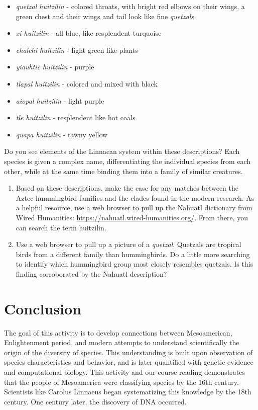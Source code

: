 \documentclass[12pt]{article}
\begin{document}
\begin{itemize}
\item \textit{quetzal huitzilin} - colored throats, with bright red elbows on their wings, a green chest and their wings and tail look like fine \textit{quetzals}
\item \textit{xi huitzilin} - all blue, like resplendent turquoise
\item \textit{chalchi huitzilin} - light green like plants
\item \textit{yiauhtic huitzilin} - purple
\item \textit{tlapal huitzilin} - colored and mixed with black
\item \textit{aiopal huitzilin} - light purple
\item \textit{tle huitzilin} - resplendent like hot coals
\item \textit{quapa huitzilin} - tawny yellow
\end{itemize}

Do you see elements of the Linnaean system within these descriptions?  Each species is given a complex name, differentiating the individual species from each other, while at the same time binding them into a family of similar creatures.

\begin{enumerate}
\item Based on these descriptions, make the case for any matches between the Aztec hummingbird families and the clades found in the modern research. As a helpful resource, use a web browser to pull up the Nahuatl dictionary from Wired Humanities: \url{https://nahuatl.wired-humanities.org/}.  From there, you can search the term huitzilin.  \\ \vspace{2.5cm}
\item Use a web browser to pull up a picture of a \textit{quetzal}.  Quetzals are tropical birds from a different family than hummingbirds.  Do a little more searching to identify which hummingbird group most closely resembles quetzals.  Is this finding corroborated by the Nahuatl description? \\ \vspace{2.5cm}
\end{enumerate}

\section{Conclusion}

The goal of this activity is to develop connections between Mesoamerican, Enlightenment period, and modern attempts to understand scientifically the origin of the diversity of species.  This understanding is built upon observation of species characteristics and behavior, and is later quantified with genetic evidence and computational biology.  This activity and our course reading demonstrates that the people of Mesoamerica were classifying species by the 16th century.  Scientists like Carolus Linnaeus began systematizing this knowledge by the 18th century.  One century later, the discovery of DNA occurred.
\end{document}
